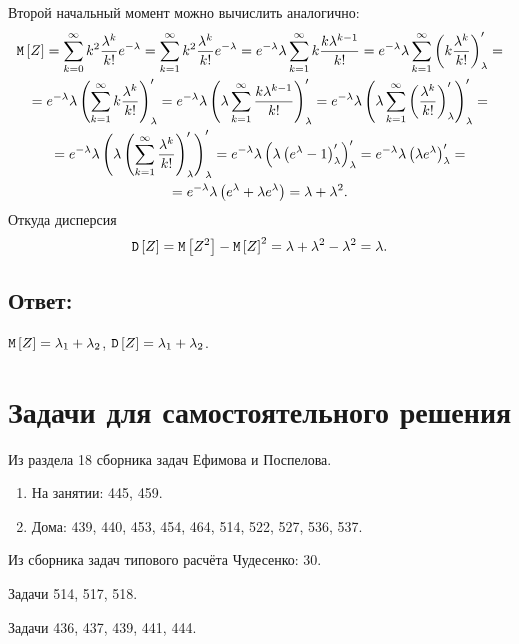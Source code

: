 Второй начальный момент можно вычислить аналогично:
\begin{multline}
    \mathtt{M} \left [ Z \right ]
    = \sum_{k=0}^{\infty} k^2 \frac{\lambda^k}{k!} e^{-\lambda}
    = \sum_{k=1}^{\infty} k^2 \frac{\lambda^k}{k!} e^{-\lambda}
    = e^{-\lambda} \lambda \sum_{k=1}^{\infty} k \frac{k \lambda^{k-1}}{k!}
    = e^{-\lambda} \lambda \sum_{k=1}^{\infty} \left ( k \frac{\lambda^k}{k!} \right )_{\lambda}^{\prime} = \\
    = e^{-\lambda} \lambda \left ( \sum_{k=1}^{\infty} k \frac{\lambda^k}{k!} \right )_{\lambda}^{\prime}
    = e^{-\lambda} \lambda \left ( \lambda \sum_{k=1}^{\infty} \frac{k \lambda^{k-1}}{k!} \right )_{\lambda}^{\prime}
    = e^{-\lambda} \lambda \left ( \lambda \sum_{k=1}^{\infty} \left ( \frac{\lambda^{k}}{k!} \right )_{\lambda}^{\prime} \right )_{\lambda}^{\prime} = \\
    = e^{-\lambda} \lambda \left ( \lambda \left ( \sum_{k=1}^{\infty} \frac{\lambda^{k}}{k!} \right )_{\lambda}^{\prime} \right )_{\lambda}^{\prime}
    = e^{-\lambda} \lambda \left ( \lambda \left ( e^\lambda - 1 \right )_{\lambda}^{\prime} \right )_{\lambda}^{\prime}
    = e^{-\lambda} \lambda \left ( \lambda e^\lambda \right )_{\lambda}^{\prime} = \\
    = e^{-\lambda} \lambda \left ( e^\lambda + \lambda e^\lambda \right )
    = \lambda + \lambda^2.
\end{multline}
Откуда дисперсия
\begin{equation}
    \mathtt{D} \left [ Z \right ]
    = \mathtt{M} \left [ Z^2 \right ] - \mathtt{M} \left [ Z \right ]^2
    = \lambda + \lambda^2 - \lambda^2
    = \lambda.
\end{equation}

\subsection*{Ответ:}
$\mathtt{M} \left [ Z \right ] = \lambda_1 + \lambda_2$, $\mathtt{D} \left [ Z \right ] = \lambda_1 + \lambda_2$.

\section*{Задачи для самостоятельного решения}

Из раздела 18 сборника задач Ефимова и Поспелова.
\begin{enumerate}
    \item На занятии: 445, 459.
    \item Дома: 439, 440, 453, 454, 464, 514, 522, 527, 536, 537.
\end{enumerate}

Из сборника задач типового расчёта Чудесенко: 30.

Задачи 514, 517, 518.

Задачи 436, 437, 439, 441, 444.
